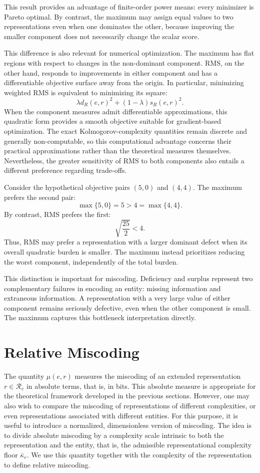 This result provides an advantage of finite-order power means: every minimizer is Pareto optimal. By contrast, the maximum may assign equal values to two representations even when one dominates the other, because improving the smaller component does not necessarily change the scalar score.

This difference is also relevant for numerical optimization. The maximum has flat regions with respect to changes in the non-dominant component. RMS, on the other hand, responds to improvements in either component and has a differentiable objective surface away from the origin. In particular, minimizing weighted RMS is equivalent to minimizing its square:
\[
\lambda d_R(e,r)^2 + (1-\lambda)s_R(e,r)^2.
\]
When the component measures admit differentiable approximations, this quadratic form provides a smooth objective suitable for gradient-based optimization. The exact Kolmogorov-complexity quantities remain discrete and generally non-computable, so this computational advantage concerns their practical approximations rather than the theoretical measures themselves. Nevertheless, the greater sensitivity of RMS to both components also entails a different preference regarding trade-offs.

\begin{example}
Consider the hypothetical objective pairs $(5,0)$ and $(4,4)$. The maximum prefers the second pair:
\[
\max\{5,0\}=5>4=\max\{4,4\}.
\]
By contrast, RMS prefers the first:
\[
\sqrt{\frac{25}{2}}<4.
\]
Thus, RMS may prefer a representation with a larger dominant defect when its overall quadratic burden is smaller. The maximum instead prioritizes reducing the worst component, independently of the total burden.
\end{example}

This distinction is important for miscoding. Deficiency and surplus represent two complementary failures in encoding an entity: missing information and extraneous information. A representation with a very large value of either component remains seriously defective, even when the other component is small. The maximum captures this bottleneck interpretation directly.

%
%


\section{Relative Miscoding}
\label{sec:relative_miscoding}

The quantity $\mu(e,r)$ measures the miscoding of an extended representation $r\in\mathcal R_e$ in absolute terms, that is, in bits. This absolute measure is appropriate for the theoretical framework developed in the previous sections. However, one may also wish to compare the miscoding of representations of different complexities, or even representations associated with different entities. For this purpose, it is useful to introduce a normalized, dimensionless version of miscoding. The idea is to divide absolute miscoding by a complexity scale intrinsic to both the representation and the entity, that is, the admissible representational complexity floor $\bar\kappa_e$. We use this quantity together with the complexity of the representation to define relative miscoding.

